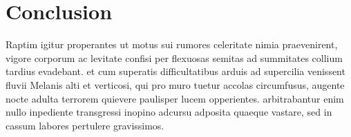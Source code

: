 \documentclass[a4paper,12pt]{report}	%
\renewcommand{\appendixpagename}{Annexes}	%
\begin{document}
	{\section*{Conclusion}}
	
\noindent Raptim igitur properantes ut motus sui rumores celeritate nimia praevenirent, vigore corporum ac levitate confisi per flexuosas semitas ad summitates collium tardius evadebant. et cum superatis difficultatibus arduis ad supercilia venissent fluvii Melanis alti et verticosi, qui pro muro tuetur accolas circumfusus, augente nocte adulta terrorem quievere paulisper lucem opperientes. arbitrabantur enim nullo inpediente transgressi inopino adcursu adposita quaeque vastare, sed in cassum labores pertulere gravissimos.
	
	
	
		


	
	\printbibliography
\end{document}
